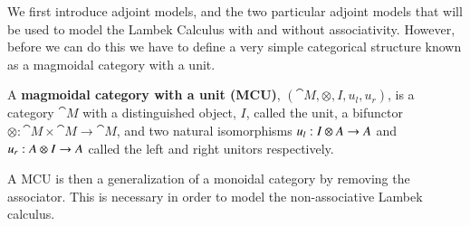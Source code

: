 We first introduce adjoint models, and the two particular adjoint
models that will be used to model the Lambek Calculus with and without
associativity.  However, before we can do this we have to define a
very simple categorical structure known as a magmoidal category with a
unit.
\begin{definition}
  \label{def:magmoidal-categories}
  A \textbf{magmoidal category with a unit (MCU)}, $(\cat{M}, \otimes,
  I, u_l,u_r)$, is a category $\cat{M}$ with a distinguished object,
  $I$, called the unit, a bifunctor $\otimes : \cat{M} \times \cat{M}
  \to \cat{M}$, and two natural isomorphisms $u_l : I \otimes A \rightarrow
  A$ and $u_r : A \otimes I \rightarrow A$ called the left and right unitors
  respectively.
\end{definition}
\noindent
A MCU is then a generalization of a monoidal category by removing the
associator.  This is necessary in order to model the non-associative
Lambek calculus.

